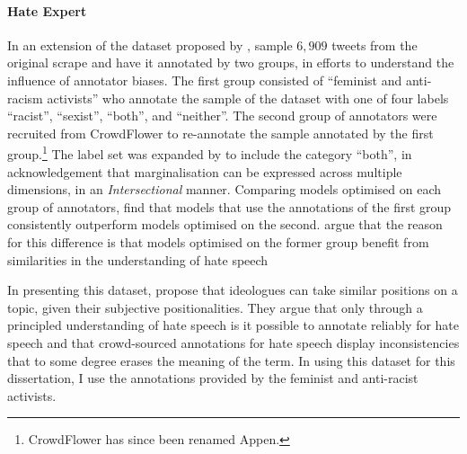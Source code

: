 \paragraph*{Hate Expert} In an extension of the dataset proposed by \citet{Waseem-Hovy:2016}, \citet{Waseem:2016} sample $6,909$ tweets from the original scrape and have it annotated by two groups, in efforts to understand the influence of annotator biases. 
The first group consisted of ``feminist and anti-racism activists'' \citep{Waseem:2016} who annotate the sample of the dataset with one of four labels ``racist'', ``sexist'', ``both'', and ``neither''.
The second group of annotators were recruited from CrowdFlower to re-annotate the sample annotated by the first group.\footnote{CrowdFlower has since been renamed Appen.}
The label set was expanded by \citet{Waseem:2016} to include the category ``both'', in acknowledgement that marginalisation can be expressed across multiple dimensions, in an \textit{Intersectional} manner. 
Comparing models optimised on each group of annotators, \citet{Waseem:2016} find that models that use the annotations of the first group consistently outperform models optimised on the second.
\citet{Waseem:2016} argue that the reason for this difference is that  models  optimised on the former group benefit from similarities in the understanding of hate speech\ZTdelete{,}

In presenting this dataset, \citet{Waseem:2016} propose that ideologues can take similar positions on a topic, given their subjective positionalities. 
They argue that only through a principled understanding of hate speech is it possible to annotate reliably for hate speech and that crowd-sourced annotations for hate speech display inconsistencies that to some degree erases the meaning of the term.
In using this dataset for this dissertation, I use the annotations provided by the feminist and anti-racist activists.

